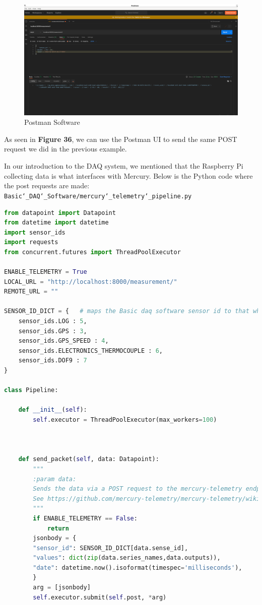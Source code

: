 \documentclass[12pt, letterpaper]{article}
\begin{document}
{{{{{{{{{{{{\begin{figure}[h!]
	\centering
	\includegraphics[width=1\columnwidth]{assets/postman.png}
	\caption{Postman Software}
	\end{figure}	

As seen in \textbf{Figure 36}, we can use the Postman UI to send the same POST request we did in the previous example. 

\par In our introduction to the DAQ system, we mentioned that the Raspberry Pi collecting data is what interfaces with Mercury. Below is the Python code where the post requests are made: \texttt{Basic\char`_DAQ\char`_Software/mercury\char`_telemetry\char`_pipeline.py}
\newpage 
\begin{lstlisting}[language=Python, caption=\texttt{mercury\char`_telemetry\char`_pipeline.py}]
from datapoint import Datapoint
from datetime import datetime
import sensor_ids
import requests
from concurrent.futures import ThreadPoolExecutor

ENABLE_TELEMETRY = True
LOCAL_URL = "http://localhost:8000/measurement/"
REMOTE_URL = ""

SENSOR_ID_DICT = {   # maps the Basic daq software sensor id to that which the user assigns in Mercury
    sensor_ids.LOG : 5,
    sensor_ids.GPS : 3,
    sensor_ids.GPS_SPEED : 4,
    sensor_ids.ELECTRONICS_THERMOCOUPLE : 6,
    sensor_ids.DOF9 : 7
}

class Pipeline:

    def __init__(self):
        self.executor = ThreadPoolExecutor(max_workers=100)



    def send_packet(self, data: Datapoint):
        """
        :param data:
        Sends the data via a POST request to the mercury-telemetry endpoint: http://"mercury-website-url"/measurement.
        See https://github.com/mercury-telemetry/mercury-telemetry/wiki/JSON-Messaging-Format for info on the JSON format
        """
        if ENABLE_TELEMETRY == False:
            return
        jsonbody = {
        "sensor_id": SENSOR_ID_DICT[data.sense_id],
        "values": dict(zip(data.series_names,data.outputs)),
        "date": datetime.now().isoformat(timespec='milliseconds'),
        }
        arg = [jsonbody]
        self.executor.submit(self.post, *arg)


\end{lstlisting}}}}}}}}}}}}}
\end{document}
